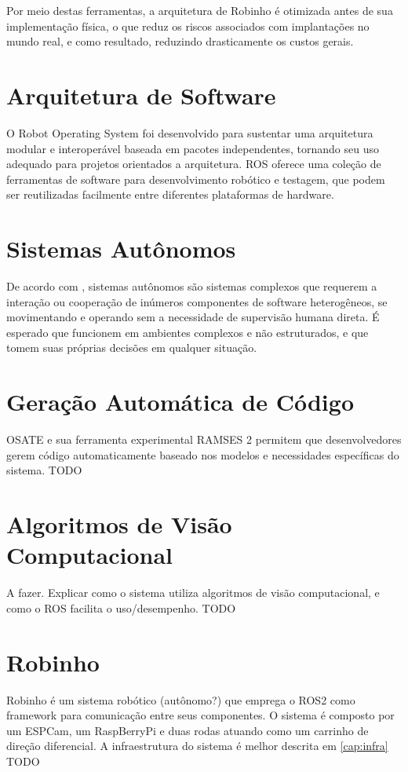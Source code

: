 Por meio destas ferramentas, a arquitetura de Robinho é otimizada antes de sua implementação física, o que reduz os riscos associados com implantações no mundo real, e como resultado, reduzindo drasticamente os custos gerais.

\section{Arquitetura de Software}
\cite{Bernardo2025, ROSWebsite} O Robot Operating System foi desenvolvido para sustentar uma arquitetura modular e interoperável baseada em pacotes independentes, tornando seu uso adequado para projetos orientados a arquitetura. ROS oferece uma coleção de ferramentas de software para desenvolvimento robótico e testagem, que podem ser reutilizadas facilmente entre diferentes plataformas de hardware.

\section{Sistemas Autônomos}
De acordo com \cite{Wahde2016, Bensalem2009}, sistemas autônomos são sistemas complexos que requerem a interação ou cooperação de inúmeros componentes de software heterogêneos, se movimentando e operando sem a necessidade de supervisão humana direta. É esperado que funcionem em ambientes complexos e não estruturados, e que tomem suas próprias decisões em qualquer situação.

\section{Geração Automática de Código}
OSATE e sua ferramenta experimental RAMSES 2 permitem que desenvolvedores gerem código automaticamente baseado nos modelos e necessidades específicas do sistema.
TODO

\section{Algoritmos de Visão Computacional}
A fazer. Explicar como o sistema utiliza algoritmos de visão computacional, e como o ROS facilita o uso/desempenho.
TODO

\section{Robinho}
Robinho é um sistema robótico (autônomo?) que emprega o ROS2 como framework para comunicação entre seus componentes. O sistema é composto por um ESPCam, um RaspBerryPi e duas rodas atuando como um carrinho de direção diferencial.
A infraestrutura do sistema é melhor descrita em \ref{cap:infra}
TODO